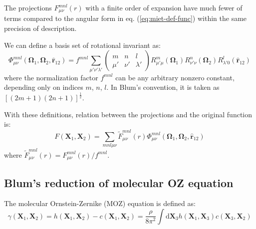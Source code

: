 The projections $F_{\mu\nu}^{mnl}(r)$ with a finite order of expansion
have much fewer of terms compared to the angular form in eq. (\ref{eq:miet-def-func})
within the same precision of description.

We can define a basis set of rotational invariant as:
\begin{equation}
\Phi_{\mu\nu}^{mnl}(\mathbf{\Omega}_{1},\mathbf{\Omega}_{2},\mathbf{\hat{r}}_{12})=f^{mnl}\sum_{\mu'\nu'\lambda'}\left(\begin{array}{ccc}
m & n & l\\
\mu' & \nu' & \lambda'
\end{array}\right)R_{\mu'\mu}^{m}(\mathbf{\Omega}_{1})R_{\nu'\nu}^{n}(\mathbf{\Omega}_{2})R_{\lambda'0}^{l}(\mathbf{\hat{r}}_{12})
\end{equation}
where the normalization factor $f^{mnl}$ can be any arbitrary nonzero
constant, depending only on indices $m$, $n$, $l$. In Blum's convention,
it is taken as $\left[\left(2m+1\right)\left(2n+1\right)\right]^{\frac{1}{2}}$.

With these definitions, relation between the projections and the original
function is:
\begin{equation}
F(\mathbf{X}_{1},\mathbf{X}_{2})=\sum_{mnl\mu\nu}\tilde{F}_{\mu\nu}^{mnl}(r)\Phi_{\mu\nu}^{mnl}(\mathbf{\Omega}_{1},\mathbf{\Omega}_{2},\mathbf{\hat{r}}_{12})
\end{equation}
where $\tilde{F}_{\mu\nu}^{mnl}(r)=F_{\mu\nu}^{mnl}(r)/f^{mnl}$.

\subsection{Blum's reduction of molecular OZ equation}

The molecular Ornstein-Zernike (\acs{MOZ}) equation is defined as:
\begin{equation}
\gamma(\mathbf{X}_{1},\mathbf{X}_{2})=h(\mathbf{X}_{1},\mathbf{X}_{2})-c(\mathbf{X}_{1},\mathbf{X}_{2})=\frac{\rho}{8\pi^{2}}\int\mathrm{d}\mathbf{X}_{3}h(\mathbf{X}_{1},\mathbf{X}_{3})c(\mathbf{X}_{3},\mathbf{X}_{2})\label{eq:4.MOZ}
\end{equation}

